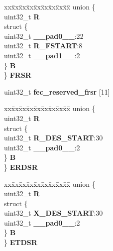 \begin{DoxyCompactItemize}
\begin{tabbing}
\end{tabbing}\item 
\mbox{\label{structFEC__tag_a6a872ec7fefe4b230e24835aee83153e}} 
\begin{tabbing}
xx\=xx\=xx\=xx\=xx\=xx\=xx\=xx\=xx\=\kill
union \{\\
\>uint32\_t {\bfseries R}\\
\>struct \{\\
\>\>uint32\_t {\bfseries \_\_pad0\_\_}:22\\
\>\>uint32\_t {\bfseries R\_FSTART}:8\\
\>\>uint32\_t {\bfseries \_\_pad1\_\_}:2\\
\>\} {\bfseries B}\\
\} {\bfseries FRSR}\\

\end{tabbing}\item 
\mbox{\label{structFEC__tag_a3238a040e8411b46a4704d22bcb54a75}} 
uint32\+\_\+t {\bfseries fec\+\_\+reserved\+\_\+frsr} \mbox{[}11\mbox{]}
\item 
\mbox{\label{structFEC__tag_aa5aedc0c9345468ec929d68fc07d966d}} 
\begin{tabbing}
xx\=xx\=xx\=xx\=xx\=xx\=xx\=xx\=xx\=\kill
union \{\\
\>uint32\_t {\bfseries R}\\
\>struct \{\\
\>\>uint32\_t {\bfseries R\_DES\_START}:30\\
\>\>uint32\_t {\bfseries \_\_pad0\_\_}:2\\
\>\} {\bfseries B}\\
\} {\bfseries ERDSR}\\

\end{tabbing}\item 
\mbox{\label{structFEC__tag_ad27de581290dcb19aeb315dc01d1d9d7}} 
\begin{tabbing}
xx\=xx\=xx\=xx\=xx\=xx\=xx\=xx\=xx\=\kill
union \{\\
\>uint32\_t {\bfseries R}\\
\>struct \{\\
\>\>uint32\_t {\bfseries X\_DES\_START}:30\\
\>\>uint32\_t {\bfseries \_\_pad0\_\_}:2\\
\>\} {\bfseries B}\\
\} {\bfseries ETDSR}\\


\end{tabbing}
\end{DoxyCompactItemize}
